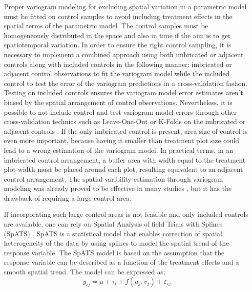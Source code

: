 \documentclass[12pt,a4paper,oneside]{report}
\begin{document}
Proper variogram modeling for excluding spatial variation in a parametric model
must be fitted on control samples \cite{larkOptimizedSpatialSampling2002, minasnyEfficiencyVariousApproaches2002,aquiles_e_effect_2024}
to avoid including treatment effects in the 
spatial terms of the parametric model. 
The control samples must be homogeneously distributed
in the space and also in time if the aim is to get spatiotemporal variation.
In order to ensure the right control sampling, it is necessary to implement a 
combined approach using both imbricated or adjacent controls along with included 
controls in the following manner:
imbricated or adjacent control observations to fit the variogram model 
while the included control to test the error of the variogram predictions in a
cross-validation fashon. Testing on included controls ensures the variogram model 
error estimates aren't biased by the spatial arrangement of control observations. 
Nevertheless, it is possible to not include control and test variogram model errors
through other cross-validation technics such as Leave-One-Out or K-Folds on the 
imbricated or adjacent controls
\cite{websterGeostatisticsEnvironmentalScientists2007,henglPracticalGuideGeostatistical2007}. 
If the only imbricated control is present, area size of control is even 
more important, because having it smaller than treatment plot size could lead to a 
wrong estimation of the variogram model. In practical terms, in an imbricated control
arrangement, a buffer area with width equal to the treatment plot width must be placed around each plot,
resulting equivalent to an adjacent control arrangement. 
The spatial varibility estimation through variogram modeling was already proved 
to be effective in many studies \cite{bullockDataIntensiveFarmManagement2019,castrignanoGeostatisticalApproachModelling2017,jinEfficientGeostatisticalAnalysis2021,puntelLeveragingDigitalAgriculture2024,trevisanSpatialVariabilityCrop2021}, 
but it has the drawback of requiring a large control area. 

If incorporating such large control areas is not feasible and only included 
controls are available, 
one can rely on Spatial Analysis of field Trials with Splines (SpATS)
\cite{rodriguez-alvarezCorrectingSpatialHeterogeneity2018,rodriguez-alvarezFastSmoothingParameter2015,leeEfficientTwodimensionalSmoothing2013}.
SpATS is a statistical model that enables correction of spatial heterogeneity
of the data by using splines to model the spatial trend of the response variable.
The SpATS model is based on the assumption that the response variable can be
described as a function of the treatment effects and a smooth spatial trend.
The model can be expressed as:
\[
y_{ij} = \mu + \tau_i + f(u_j, v_j) + \varepsilon_{ij}
\]
\end{document}
